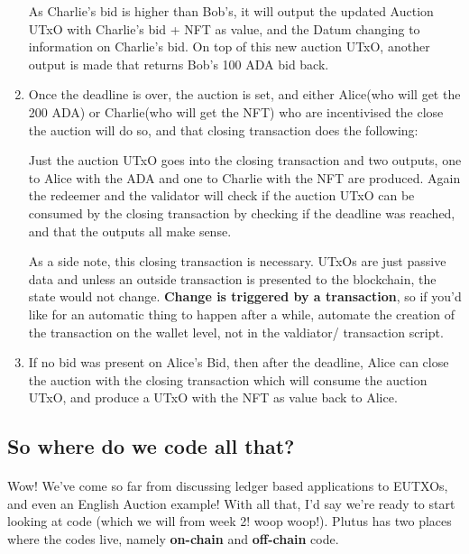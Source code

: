 \documentclass[a4paper, 11pt]{article}
\begin{document}
\begin{enumerate}
        As Charlie's bid is higher than Bob's, it will output the updated Auction UTxO with Charlie's bid + NFT as value, and the Datum changing to information on Charlie's bid. On top of this new auction UTxO, another output is made that returns Bob's 100 ADA bid back.
        
        \item Once the deadline is over, the auction is set, and either Alice(who will get the 200 ADA) or Charlie(who will get the NFT) who are incentivised the close the auction will do so, and that closing transaction does the following:
        
        Just the auction UTxO goes into the closing transaction and two outputs, one to Alice with the ADA and one to Charlie with the NFT are produced. Again the redeemer and the validator will check if the auction UTxO can be consumed by the closing transaction by checking if the deadline was reached, and that the outputs all make sense.

        As a side note, this closing transaction is necessary. UTxOs are just passive data and unless an outside transaction is presented to the blockchain, the state would not change. \textbf{Change is triggered by a transaction}, so if you'd like for an automatic thing to happen after a while, automate the creation of the transaction on the wallet level, not in the valdiator/ transaction script.

        \item If no bid was present on Alice's Bid, then after the deadline, Alice can close the auction with the closing transaction which will consume the auction UTxO, and produce a UTxO with the NFT as value back to Alice.
        \end{enumerate}


    \subsection{So where do we code all that?}

    \paragraph{} Wow! We've come so far from discussing ledger based applications to EUTXOs, and even an English Auction example! With all that, I'd say we're ready to start looking at code (which we will from week 2! woop woop!).  Plutus has two places where the codes live, namely \textbf{on-chain} and \textbf{off-chain} code.
\end{document}
